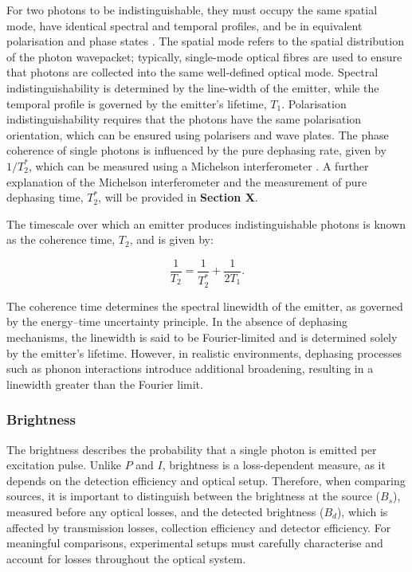 For two photons to be indistinguishable, they must occupy the same spatial mode, have identical spectral and temporal profiles, and be in equivalent polarisation and phase states \cite{Senellart2017}. The spatial mode refers to the spatial distribution of the photon wavepacket; typically, single-mode optical fibres are used to ensure that photons are collected into the same well-defined optical mode. Spectral indistinguishability is determined by the line-width of the emitter, while the temporal profile is governed by the emitter’s lifetime, $T_1$. Polarisation indistinguishability requires that the photons have the same polarisation orientation, which can be ensured using polarisers and wave plates. The phase coherence of single photons is influenced by the pure dephasing rate, given by $1/T_2^*$, which can be measured using a Michelson interferometer \cite{Michelson1887, Jelezko2003}. A further explanation of the Michelson interferometer and the measurement of pure dephasing time, $T_2^*$, will be provided in \textbf{Section X}. 

The timescale over which an emitter produces indistinguishable photons is known as the coherence time, $T_2$, and is given by:

\begin{equation}
    \frac{1}{T_2}=\frac{1}{T_2^*} + \frac{1}{2T_1}.
    \label{eqn:coherence_time}
\end{equation}

 The coherence time determines the spectral linewidth of the emitter, as governed by the energy–time uncertainty principle. In the absence of dephasing mechanisms, the linewidth is said to be Fourier-limited and is determined solely by the emitter's lifetime. However, in realistic environments, dephasing processes such as phonon interactions introduce additional broadening, resulting in a linewidth greater than the Fourier limit.



\subsubsection{Brightness}

The brightness describes the probability that a single photon is emitted per excitation pulse. Unlike $P$ and $I$, brightness is a loss-dependent measure, as it depends on the detection efficiency and optical setup. Therefore, when comparing sources, it is important to distinguish between the brightness at the source ($B_s$), measured before any optical losses, and the detected brightness ($B_d$), which is affected by transmission losses, collection efficiency and detector efficiency. For meaningful comparisons, experimental setups must carefully characterise and account for losses throughout the optical system.

